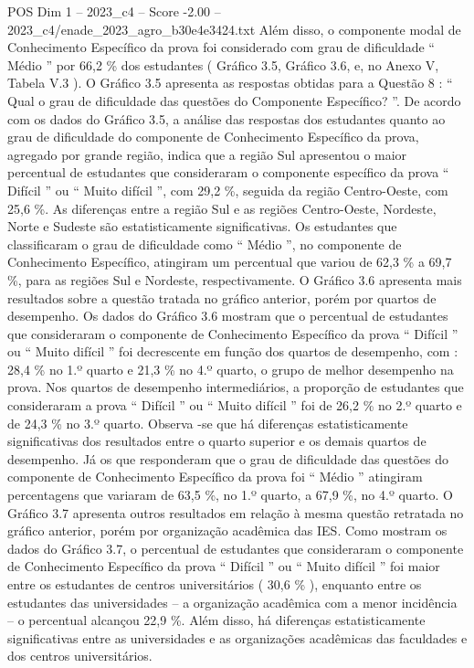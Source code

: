 \begin{textsample}{POS Dim 1 – 2023\_c4 – Score -2.00 – 2023\_c4/enade\_2023\_agro\_b30e4e3424.txt}
Além disso, o componente modal de Conhecimento Específico da prova foi considerado com grau de dificuldade “ Médio ” por 66,2 \% dos estudantes ( Gráfico 3.5, Gráfico 3.6, e, no Anexo V, Tabela V.3 ).
O Gráfico 3.5 apresenta as respostas obtidas para a Questão 8 : “ Qual o grau de dificuldade das questões do Componente Específico? ”.
De acordo com os dados do Gráfico 3.5, a análise das respostas dos estudantes quanto ao grau de dificuldade do componente de Conhecimento Específico da prova, agregado por grande região, indica que a região Sul apresentou o maior percentual de estudantes que consideraram o componente específico da prova “ Difícil ” ou “ Muito difícil ”, com 29,2 \%, seguida da região Centro-Oeste, com 25,6 \%.
As diferenças entre a região Sul e as regiões Centro-Oeste, Nordeste, Norte e Sudeste são estatisticamente significativas.
Os estudantes que classificaram o grau de dificuldade como “ Médio ”, no componente de Conhecimento Específico, atingiram um percentual que variou de 62,3 \% a 69,7 \%, para as regiões Sul e Nordeste, respectivamente.
O Gráfico 3.6 apresenta mais resultados sobre a questão tratada no gráfico anterior, porém por quartos de desempenho.
Os dados do Gráfico 3.6 mostram que o percentual de estudantes que consideraram o componente de Conhecimento Específico da prova “ Difícil ” ou “ Muito difícil ” foi decrescente em função dos quartos de desempenho, com : 28,4 \% no 1.º quarto e 21,3 \% no 4.º quarto, o grupo de melhor desempenho na prova.
Nos quartos de desempenho intermediários, a proporção de estudantes que consideraram a prova “ Difícil ” ou “ Muito difícil ” foi de 26,2 \% no 2.º quarto e de 24,3 \% no 3.º quarto.
Observa -se que há diferenças estatisticamente significativas dos resultados entre o quarto superior e os demais quartos de desempenho.
Já os que responderam que o grau de dificuldade das questões do componente de Conhecimento Específico da prova foi “ Médio ” atingiram percentagens que variaram de 63,5 \%, no 1.º quarto, a 67,9 \%, no 4.º quarto.
O Gráfico 3.7 apresenta outros resultados em relação à mesma questão retratada no gráfico anterior, porém por organização acadêmica das IES.
Como mostram os dados do Gráfico 3.7, o percentual de estudantes que consideraram o componente de Conhecimento Específico da prova “ Difícil ” ou “ Muito difícil ” foi maior entre os estudantes de centros universitários ( 30,6 \% ), enquanto entre os estudantes das universidades – a organização acadêmica com a menor incidência – o percentual alcançou 22,9 \%.
Além disso, há diferenças estatisticamente significativas entre as universidades e as organizações acadêmicas das faculdades e dos centros universitários.

\end{textsample}
